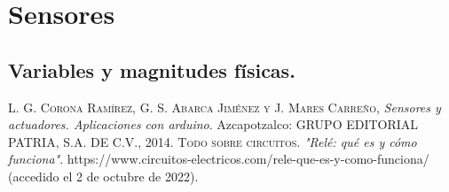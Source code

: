 \documentclass[11pt, a4paper]{book}
\author{Carlos Alberto Conde Angel}
\title{}
\begin{document}

\tableofcontents


\chapter*{Sensores}
 
	
\section{Variables y magnitudes físicas.}




\begin{thebibliography}{X}
 

 \textsc{L. G. Corona Ramírez, G. S. Abarca Jiménez y J. Mares Carreño}, \textit{Sensores y actuadores. Aplicaciones con arduino}. Azcapotzalco: GRUPO EDITORIAL PATRIA, S.A. DE C.V., 2014.
 \textsc{ Todo sobre circuitos.} \textit{"Relé: qué es y cómo funciona"}. https://www.circuitos-electricos.com/rele-que-es-y-como-funciona/ (accedido el 2 de octubre de 2022).


\end{thebibliography}
\end{document}
